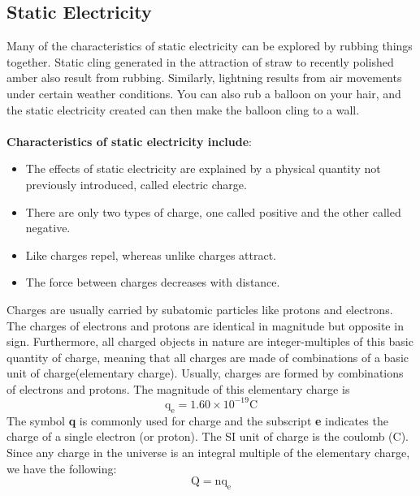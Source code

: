 \documentclass[9pt]{exam}
\begin{document}
	\subsection*{Static Electricity}
	Many of the characteristics of static electricity can be explored by rubbing things together. Static cling generated in the attraction of straw to recently polished amber also result from rubbing. Similarly, lightning results from air movements under certain weather conditions. You can also rub a balloon on your hair, and the static electricity created can then make the balloon cling to a wall. \\ \\
	\textbf{Characteristics of static electricity include}:
	\begin{itemize}
		\item The effects of static electricity are explained by a physical quantity not previously introduced, called electric charge.
		\item There are only two types of charge, one called positive and the other called negative.
		\item Like charges repel, whereas unlike charges attract.
		\item The force between charges decreases with distance.
	\end{itemize}
	Charges are usually carried by subatomic particles like protons and electrons. The charges of electrons and protons are identical in magnitude but opposite in sign. Furthermore, all charged objects in nature are integer-multiples of this basic quantity of charge, meaning that all charges are made of combinations of a basic unit of charge(elementary charge). Usually, charges are formed by combinations of electrons and protons. The magnitude of this elementary charge is
	$$\text{q}_\text{e}=1.60\times10^{-19}\text{C}$$ The symbol \textbf{q} is commonly used for charge and the subscript \textbf{e} indicates the charge of a single electron (or proton).
	The SI unit of charge is the coulomb (C). Since any charge in the universe is an integral multiple of the elementary charge, we have the following:
	$$\text{Q}=\text{nq}_\text{e}$$
\end{document}
